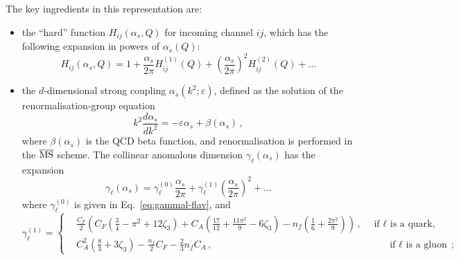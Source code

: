 The key ingredients in this representation are:
\begin{itemize}
\item
  the ``hard'' function $H_{ij}(\alpha_s,Q)$ for incoming channel $ij$, which has the following expansion in powers of $\alpha_s(Q)$:
  \begin{equation}
    \label{eq:HQ-exp}
    H_{ij}(\alpha_s,Q) = 1+\frac{\alpha_s}{2\pi}H_{ij}^{(1)}(Q) +\left(\frac{\alpha_s}{2\pi}\right)^2H_{ij}^{(2)}(Q)+\dots 
  \end{equation}
  
\item the $d$-dimensional strong coupling $\alpha_s(k^2;\varepsilon)$, defined as the solution of the renormalisation-group equation
\begin{equation}
  \label{eq:RG-coupling}
  k^2\frac{d\alpha_s}{dk^2} = - \varepsilon \alpha_s+\beta(\alpha_s)\,,
\end{equation}
where $\beta(\alpha_s)$ is the QCD beta function, and renormalisation
is performed in the $\overline{\rm MS}$ scheme. The collinear anomalous dimension $\gamma_\ell(\alpha_s)$ has the expansion 
\begin{equation}
  \label{eq:gammal}
  \gamma_\ell (\alpha_s) = \gamma^{(0)}_\ell \frac{\alpha_s}{2\pi} + \gamma^{(1)}_\ell \left(\frac{\alpha_s}{2\pi} \right)^2+\dots
\end{equation}
where $\gamma_\ell^{(0)}$ is given in Eq.~\eqref{eq:gammal-flav}, and 
 \begin{equation}
  \label{eq:gammal1-flav}
  \gamma_\ell^{(1)} = \left\{
    \begin{split}
      &\frac{C_F}{2}\left(C_F\left(\frac{3}{4}-\pi^2+12\zeta_3\right)+C_A\left(\frac{17}{12}+\frac{11\pi^2}{9}-6\zeta_3\right)-n_f\left(\frac{1}{6}+\frac{2\pi^2}{9}\right)\right)\,,\quad \text{if $\ell$ is a quark,} \\
      & C_A^2\left(\frac{8}{3}+3\zeta_3\right)-\frac{n_f}{2}C_F-\frac{2}{3}n_fC_A \,,\qquad\qquad\qquad\qquad\qquad\qquad\qquad\qquad\qquad\text{if $\ell$ is a gluon}\,;
    \end{split}
    \right.
\end{equation}


\end{itemize}
